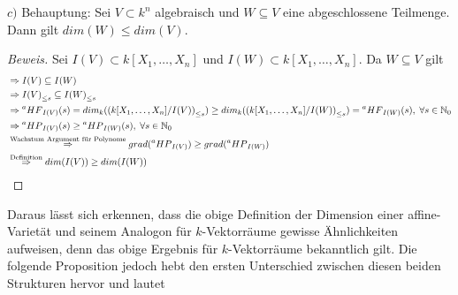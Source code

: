 \documentclass{article}
\newcommand*{\R}{k[X_{1},\ldots,X_{n}]}
\newcommand*{\indx}[2]{{#1}_{#2}}
\newcommand*{\N}{\mathbb{N}_0}
\newcommand*{\hf}[1]{$\prescript{a}{}{HF}_{#1}$}
\newcommand*{\hp}[1]{$\prescript{a}{}{HP}_{#1}$}
\begin{document}
$c)$ Behauptung: Sei $V\subset k^n$ algebraisch und $W\subseteq V$ eine abgeschlossene Teilmenge. Dann gilt $dim(W)\leq dim(V)$.\\

\begin{proof}[Beweis]
	Sei $I(V)\subset\R$ und $I(W)\subset\R$. Da $W\subseteq V$ gilt
	\begin{align*}
	 &\Rightarrow I(V)\subseteq I(W)\\ & 
	  \Rightarrow \indx{I(V)}{\leq s}\subseteq \indx{I(W)}{\leq s}\\&
	  \Rightarrow \textnormal{\hf{I(V)}}(s)=\indx{dim}{k}(\indx{(\R/I(V))}{\leq s})\geq \indx{dim}{k}(\indx{(\R/I(W))}{\leq s})= \textnormal{\hf{I(W)}}(s),\; \forall s\in \N \\&
	  \Rightarrow \textnormal{\hp{I(V)}}(s) \geq \textnormal{\hp{I(W)}}(s),\; \forall s\in \N \\&
	  \stackrel{\textnormal{Wachstum Argument für Polynome}}{\Rightarrow}grad(\textnormal{\hp{I(V)}}) \geq grad(\textnormal{\hp{I(W)}}) \\&
	  \stackrel{\textnormal{Definition}}{\Rightarrow} dim(I(V))\geq dim(I(W))
	\end{align*}
\end{proof}
Daraus lässt sich erkennen, dass die obige Definition der Dimension einer affine-Varietät und seinem Analogon für $k$-Vektorräume gewisse Ähnlichkeiten aufweisen, denn das obige Ergebnis für $k$-Vektorräume bekanntlich gilt. Die folgende Proposition jedoch hebt den ersten Unterschied zwischen diesen beiden Strukturen hervor und lautet
\end{document}
